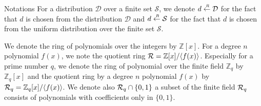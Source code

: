 \begin{subsection}{Notations}
  For a distribution $\mathcal{D}$ over a finite set $\mathcal{S}$,
  we denote $d \stackrel{{\scriptscriptstyle \mkern4mu R}}{\gets} \mathcal{D}$ for the fact that $d$ is chosen from the distribution $\mathcal{D}$ and
  $d \stackrel{{\scriptscriptstyle \mkern4mu R}}{\gets} \mathcal{S}$ for the fact that $d$ is chosen from the uniform distribution over the finite set $\mathcal{S}$.\

  We denote the ring of polynomials over the integers by $\mathbb{Z}[x]$.
  For a degree $n$ polynomial $f(x)$, we note the quotient ring ${\mathcal{R}} = \mathbb{Z}[x]/\langle f(x) \rangle$.
  Especially for a prime number $q$, we denote the ring of polynomial over the finite field $\mathbb{Z}_q$ by $\mathbb{Z}_q[x]$
  and the quotient ring by a degree $n$ polynomial $f(x)$ by ${\mathcal{R}}_q = \mathbb{Z}_q[x]/\langle f(x) \rangle$.
  We denote also ${\mathcal{R}}_q\cap \{0,1\}$ a subset of the finite field ${\mathcal{R}}_q$ consists of polynomials with coefficients only in $ \{0,1\}$.

\end{subsection}

